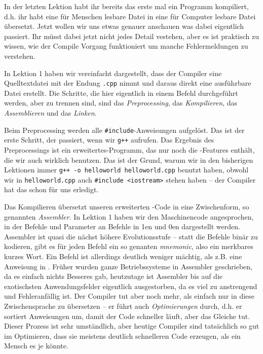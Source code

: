 
In der letzten Lektion habt ihr bereits das erste mal ein Programm kompiliert,
d.h. ihr habt eine für Menschen lesbare Datei in eine für Computer lesbare Datei
übersetzt. Jetzt wollen wir uns etwas genauer anschauen was dabei eigentlich passiert.
Ihr müsst dabei jetzt nicht jedes Detail vestehen, aber es ist praktisch zu
wissen, wie der Compile Vorgang funktioniert um manche Fehlermeldungen zu verstehen.

In Lektion 1 haben wir vereinfacht dargestellt, dass der Compiler eine
Quelltextdatei mit der Endung \texttt{.cpp} nimmt und daraus direkt eine
ausführbare Datei erstellt. Die Schritte, die hier eigentlich in einem Befehl
durchgeführt werden, aber zu trennen sind, sind das \emph{Preprocessing}, das \emph{Kompilieren}, das
\emph{Assemblieren} und das \emph{Linken}.

Beim Preprocessing werden alle \texttt{\#include}-Anweisungen aufgelöst.
Das ist der erste Schritt, der passiert, wenn wir \texttt{g++}
aufrufen. Das Ergebnis des Preprocessings ist ein erweitertes\Cpp-Programm, das nur noch die
\Cpp-Features enthält, die wir auch wirklich benutzen. Das ist der Grund, warum wir
in den bisherigen Lektionen immer \texttt{g++ -o helloworld helloworld.cpp} benutzt haben,
obwohl wir in \texttt{helloworld.cpp} auch \texttt{\#include <iostream>} stehen haben
-- der Compiler hat das schon für uns erledigt.

Das Kompilieren übersetzt unseren erweiterten \Cpp-Code in eine Zwischenform, so genannten
\emph{Assembler}. In Lektion 1 haben wir den Maschinencode angesprochen, in der
Befehle und Parameter an Befehle in 1en und 0en dargestellt werden. Assembler
ist quasi die nächst höhere Evolutionsstufe -- statt die Befehle binär zu
kodieren, gibt es für jeden Befehl ein so genanten \emph{mnemonic}, also ein
merkbares kurzes Wort. Ein Befehl ist allerdings deutlich weniger mächtig, als
z.B. eine Anweisung in \Cpp. Früher wurden ganze Betriebssysteme in Assembler
geschrieben, da es einfach nichts Besseres gab, heutzutage ist Assembler bis
auf die exotischsten Anwendungsfelder eigentlich ausgestorben, da es viel zu
anstrengend und Fehleranfällig ist. Der Compiler tut aber noch mehr, als
einfach nur in diese Zwischensprache zu übersetzen -- er führt auch
\emph{Optimierungen} durch, d.h. er sortiert Anweisungen um, damit der Code
schneller läuft, aber das Gleiche tut. Dieser Prozess ist sehr umständlich,
aber heutige Compiler sind tatsächlich so gut im Optimieren, dass sie meistens
deutlich schnelleren Code erzeugen, als ein Mensch es je könnte.

